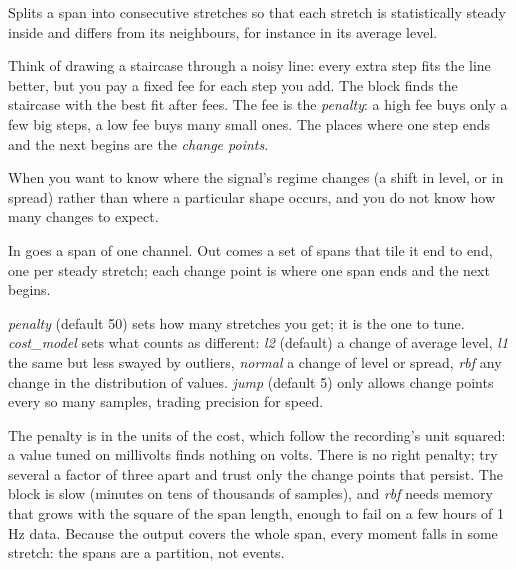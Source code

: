 Splits a span into consecutive stretches so that each stretch is statistically steady
inside and differs from its neighbours, for instance in its average level.

\begin{plainterms}
Think of drawing a staircase through a noisy line: every extra step fits the line better,
but you pay a fixed fee for each step you add. The block finds the staircase with the best
fit after fees. The fee is the \emph{penalty}: a high fee buys only a few big steps, a low
fee buys many small ones. The places where one step ends and the next begins are the
\emph{change points}.
\end{plainterms}

When you want to know where the signal's regime changes (a shift in level, or in spread)
rather than where a particular shape occurs, and you do not know how many changes to expect.

In goes a span of one channel. Out comes a set of spans that tile it end to end, one per
steady stretch; each change point is where one span ends and the next begins.

\emph{penalty} (default 50) sets how many stretches you get; it is the one to tune.
\emph{cost\_model} sets what counts as different: \emph{l2} (default) a change of average
level, \emph{l1} the same but less swayed by outliers, \emph{normal} a change of level or
spread, \emph{rbf} any change in the distribution of values. \emph{jump} (default 5) only
allows change points every so many samples, trading precision for speed.

The penalty is in the units of the cost, which follow the recording's unit squared: a value
tuned on millivolts finds nothing on volts. There is no right penalty; try several a factor
of three apart and trust only the change points that persist. The block is slow (minutes on
tens of thousands of samples), and \emph{rbf} needs memory that grows with the square of the
span length, enough to fail on a few hours of 1\,Hz data. Because the output covers the whole
span, every moment falls in some stretch: the spans are a partition, not events.
